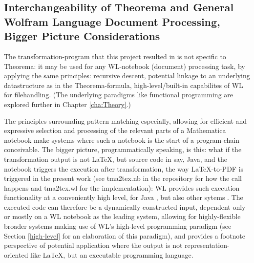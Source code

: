 \subsection{Interchangeability of Theorema and General Wolfram Language Document Processing, Bigger Picture Considerations}

The transformation-program that this project resulted in is not specific to Theorema: it may be used for any WL-notebook (document) processing task, by applying the same principles: recursive descent, potential linkage to an underlying datastructure as in the Theorema-formula, high-level/built-in capabilites of WL for filehandling. (The underlying paradigms like functional programming are explored further in Chapter \ref{cha:Theory}.)

The principles surrounding pattern matching especially, allowing for efficient and expressive selection and processing of the relevant parts of a Mathematica notebook make systems where such a notebook is the start of a program-chain conceivable. The bigger picture, programmatically speaking, is this: what if the transformation output is not \LaTeX, but source code in say, Java, and the notebook triggers the execution after transformation, the way \LaTeX-to-PDF is triggered in the present work (see tma2tex.nb in the repository for how the call happens and tma2tex.wl for the implementation): WL provides such execution functionality at a conveniently high level, for Java \cite{noauthor_connect_nodate-1}, but also other sytems \cite{noauthor_connect_nodate}. The executed code can therefore be a dynamically constructed input, dependent only or mostly on a WL notebook as the leading system, allowing for highly-flexible broader systems making use of WL's high-level programming paradigm (see Section \ref{high-level} for an elaboration of this paradigm), and provides a footnote perspective of potential application where the output is not representation-oriented like \LaTeX, but an executable programming language.